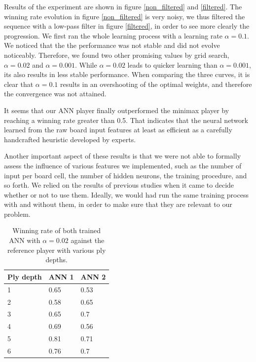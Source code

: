 \documentclass[a4paper, 9pt, twoside, twocolumn]{article}
\begin{document}
Results of the experiment are shown in figure \ref{non_filtered} and
\ref{filtered}. The winning rate evolution in figure \ref{non_filtered} is very
noisy, we thus filtered the sequence with a low-pass filter in figure
\ref{filtered}, in order to see more clearly the progression. We first ran the
whole learning process with a learning rate $\alpha=0.1$. We noticed that the
the performance was not stable and did not evolve noticeably. Therefore, we
found two other promising values by grid search, $\alpha=0.02$ and
$\alpha=0.001$. While $\alpha=0.02$ leads to quicker learning than
$\alpha=0.001$, its also results in less stable performance. When comparing the
three curves, it is clear that $\alpha=0.1$ results in an overshooting of the
optimal weights, and therefore the convergence was not attained.

It seems that our ANN player finally outperformed the minimax player by reaching
a winning rate greater than 0.5. That indicates that the neural network learned
from the raw board input features at least as efficient as a carefully
handcrafted heuristic developed by experts.

Another important aspect of these results is that we were not able to formally
assess the influence of various features we implemented, such as the number of
input per board cell, the number of hidden neurons, the training procedure, and
so forth. We relied on the results of previous studies when it came to decide
whether or not to use them. Ideally, we would had run the same training process
with and without them, in order to make sure that they are relevant to our
problem.

\begin{table}
    \centering
    \begin{tabular}{lll}
        Ply depth & ANN 1 & ANN 2\\
        \hline
        1 & 0.65 & 0.53 \\
        2 & 0.58 & 0.65 \\
        3 & 0.65 & 0.7 \\
        4 & 0.69 & 0.56 \\
        5 & 0.81 & 0.71 \\
        6 & 0.76 & 0.7 \\
        \hline
    \end{tabular}
    \caption{Winning rate of both trained ANN with $\alpha=0.02$ against the reference player with
            various ply depths.}
    \label{tab02}
\end{table}
\end{document}
